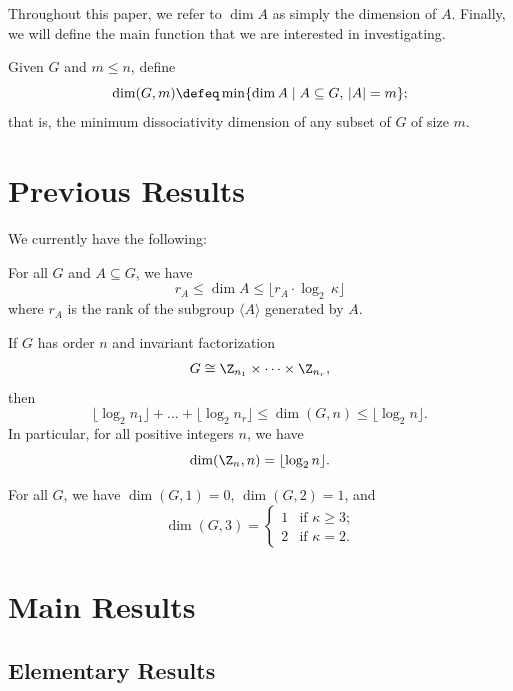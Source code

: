 \documentclass[ml, 3cm]{sdoc}
\begin{document}
Throughout this paper, we refer to $\dim A$ as simply the dimension of $A$. Finally, we will define the main function that we are interested in investigating.

\begin{definition}
Given $G$ and $m\leq n$, define
    \[\dim(G,m)\defeq\min \{\dim A\mid A \subseteq G,\, |A|=m\};\]
    that is, the minimum dissociativity dimension of any subset of $G$ of size $m$.
\end{definition}

\section{Previous Results}

We currently have the following:

\begin{theorem}\label{F.188}
    For all $G$ and $A\subseteq G$, we have
    \[r_A\leq \dim A\leq \lfloor r_A\cdot\log_2\,\kappa\rfloor\]
    where $r_A$ is the rank of the subgroup $\langle A\rangle$ generated by $A$.
\end{theorem}

\begin{proposition}\label{nr}
    If $G$ has order $n$ and invariant factorization
    \[G\cong\Z_{n_1}\times\cdots\times\Z_{n_r},\]
    then
    \[\lfloor\log_2 n_1\rfloor+\ldots+\lfloor\log_2 n_r\rfloor\leq\dim(G,n)\leq\lfloor\log_2 n\rfloor.\]
    In particular, for all positive integers $n$, we have
    \[\dim(\Z_n,n)=\lfloor\log_2 n\rfloor.\]
\end{proposition}

\begin{proposition}\label{123}
    For all $G$, we have $\dim(G, 1)=0$, $\dim(G, 2)=1$, and
    \[\dim(G, 3) = \begin{cases}1 & \text{if $\kappa\geq3$;} \\ 2 & \text{if $\kappa=2$.}\end{cases}\]
\end{proposition}

\section{Main Results}

\subsection*{Elementary Results}
\end{document}
